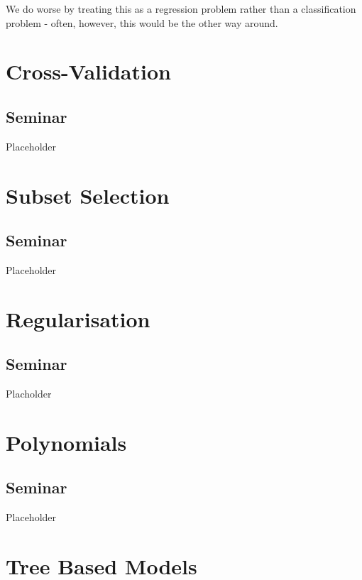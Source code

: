 \documentclass[]{article}
\begin{document}
We do worse by treating this as a regression problem rather than a classification problem - often, however, this would be the other way around.

\hypertarget{cross-validation}{%
\section{Cross-Validation}\label{cross-validation}}

\hypertarget{seminar-1}{%
\subsection{Seminar}\label{seminar-1}}

Placeholder

\hypertarget{subset-selection}{%
\section{Subset Selection}\label{subset-selection}}

\hypertarget{seminar-2}{%
\subsection{Seminar}\label{seminar-2}}

Placeholder

\hypertarget{regularisation}{%
\section{Regularisation}\label{regularisation}}

\hypertarget{seminar-3}{%
\subsection{Seminar}\label{seminar-3}}

Placholder

\hypertarget{polynomials}{%
\section{Polynomials}\label{polynomials}}

\hypertarget{seminar-4}{%
\subsection{Seminar}\label{seminar-4}}

Placeholder

\hypertarget{tree-based-models}{%
\section{Tree Based Models}\label{tree-based-models}}
\end{document}
